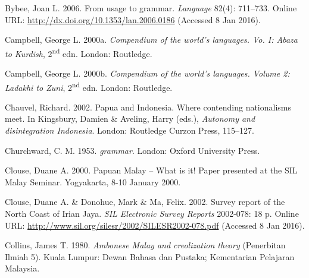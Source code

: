 \begin{styleCitaviBibliographyEntry}
Bybee, Joan L. 2006. From usage to grammar. \textit{Language} 82(4): 711–733. Online URL: \url{http://dx.doi.org/10.1353/lan.2006.0186} (Accessed 8 Jan 2016).
\end{styleCitaviBibliographyEntry}

\begin{styleCitaviBibliographyEntry}
Campbell, George L. 2000a. \textit{Compendium of the world’s languages. Vo. I: Abaza to Kurdish}, 2\textsuperscript{nd} edn. London: Routledge.
\end{styleCitaviBibliographyEntry}

\begin{styleCitaviBibliographyEntry}
Campbell, George L. 2000b. \textit{Compendium of the world’s languages. Volume 2: Ladakhi to Zuni}, 2\textsuperscript{nd} edn. London: Routledge.
\end{styleCitaviBibliographyEntry}

\begin{styleCitaviBibliographyEntry}
Chauvel, Richard. 2002. Papua and Indonesia. Where contending nationalisms meet. In Kingsbury, Damien \& Aveling, Harry (eds.), \textit{Autonomy and disintegration Indonesia}. London: Routledge Curzon Press, 115–127.
\end{styleCitaviBibliographyEntry}

\begin{styleCitaviBibliographyEntry}
Churchward, C. M. 1953. \textit{ grammar}. London: Oxford University Press.
\end{styleCitaviBibliographyEntry}

\begin{styleCitaviBibliographyEntry}
Clouse, Duane A. 2000. Papuan Malay – What is it! Paper presented at the SIL Malay Seminar. Yogyakarta, 8-10 January 2000.
\end{styleCitaviBibliographyEntry}

\begin{styleCitaviBibliographyEntry}
Clouse, Duane A. \& Donohue, Mark \& Ma, Felix. 2002. Survey report of the North Coast of Irian Jaya. \textit{SIL Electronic Survey Reports} 2002-078: 18 p. Online URL: \url{http://www.sil.org/silesr/2002/SILESR2002-078.pdf} (Accessed 8 Jan 2016).
\end{styleCitaviBibliographyEntry}


\begin{styleCitaviBibliographyEntry}
Collins, James T. 1980. \textit{Ambonese Malay and creolization theory} (Penerbitan Ilmiah 5). Kuala Lumpur: Dewan Bahasa dan Pustaka; Kementarian Pelajaran Malaysia.
\end{styleCitaviBibliographyEntry}

